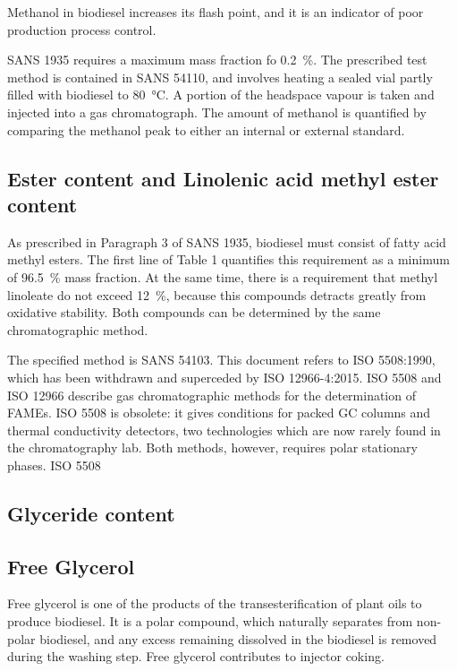 Methanol in biodiesel increases its flash point, and it is an indicator of poor
production process control.

SANS 1935 requires a maximum mass fraction fo \SI{0.2}{\percent}. The prescribed
test method is contained in SANS 54110, and involves heating a sealed vial
partly filled with biodiesel to \SI{80}{\celsius}. A portion of the headspace
vapour is taken and injected into a gas chromatograph. The amount of methanol is
quantified by comparing the methanol peak to either an internal or external
standard.

\subsection{Ester content and Linolenic acid methyl ester content}

As prescribed in Paragraph 3 of SANS 1935, biodiesel must consist of fatty acid
methyl esters. The first line of Table 1 quantifies this requirement as a
minimum of \SI{96.5}{\percent} mass fraction. At the same time, there is a
requirement that methyl linoleate do not exceed \SI{12}{\percent}, because this
compounds detracts greatly from oxidative stability. Both compounds can be
determined by the same chromatographic method.

The specified method is SANS 54103. This document refers to ISO 5508:1990, which
has been withdrawn and superceded by ISO 12966-4:2015. ISO 5508 and ISO 12966
describe gas chromatographic methods for the determination of FAMEs. ISO 5508 is
obsolete: it gives conditions for packed GC columns and thermal conductivity
detectors, two technologies which are now rarely found in the chromatography
lab. Both methods, however, requires polar stationary phases. ISO 5508 

\subsection{Glyceride content}
\label{sec:Glycerides}


\subsection{Free Glycerol}

Free glycerol is one of the products of the transesterification of plant oils to
produce biodiesel. It is a polar compound, which naturally separates from
non-polar biodiesel, and any excess remaining dissolved in the biodiesel is
removed during the washing step. Free glycerol contributes to injector coking. 

